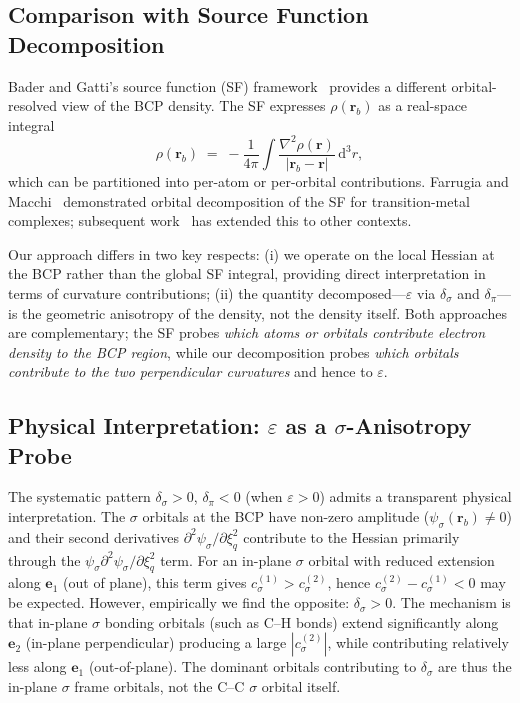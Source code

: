 \documentclass[twoside,natbib]{svjour3}
\newcommand{\delsg}{\delta_{\sigma}}
\newcommand{\delpi}{\delta_{\pi}}
\newcommand{\eps}{\varepsilon}
\begin{document}
\subsection{Comparison with Source Function Decomposition}

Bader and Gatti's source function (SF) framework~\citep{BaderGatti1998}
provides a different orbital-resolved view of the BCP density. The SF
expresses $\rho(\mathbf{r}_b)$ as a real-space integral
\begin{equation}
\rho(\mathbf{r}_b)
\;=\;
-\frac{1}{4\pi} \int \frac{\nabla^2 \rho(\mathbf{r})}
                          {|\mathbf{r}_b - \mathbf{r}|}\,
\mathrm{d}^3 r,
\label{eq:sf}
\end{equation}
which can be partitioned into per-atom or per-orbital contributions.
Farrugia and Macchi~\citep{Farrugia2009} demonstrated orbital
decomposition of the SF for transition-metal complexes; subsequent
work~\citep{Monza2011,Baggioli2018} has extended this to other
contexts.

Our approach differs in two key respects: (i) we operate on the local
Hessian at the BCP rather than the global SF integral, providing
direct interpretation in terms of curvature contributions; (ii) the
quantity decomposed---$\eps$ via $\delsg$ and $\delpi$---is the
geometric anisotropy of the density, not the density itself. Both
approaches are complementary; the SF probes \emph{which atoms or
orbitals contribute electron density to the BCP region}, while
our decomposition probes \emph{which orbitals contribute to the
two perpendicular curvatures} and hence to $\eps$.

\subsection{Physical Interpretation: $\eps$ as a $\sigma$-Anisotropy Probe}

The systematic pattern $\delsg > 0$, $\delpi < 0$ (when $\eps > 0$)
admits a transparent physical interpretation. The
$\sigma$ orbitals at the BCP have non-zero amplitude
($\psi_\sigma(\mathbf{r}_b) \ne 0$) and their second derivatives
$\partial^2 \psi_\sigma / \partial \xi_q^2$ contribute to the
Hessian primarily through the
$\psi_\sigma \partial^2 \psi_\sigma / \partial \xi_q^2$ term.
For an in-plane $\sigma$ orbital with reduced extension along
$\mathbf{e}_1$ (out of plane), this term gives
$c_\sigma^{(1)} > c_\sigma^{(2)}$, hence
$c_\sigma^{(2)} - c_\sigma^{(1)} < 0$ may be expected. However,
empirically we find the opposite: $\delsg > 0$. The mechanism is
that in-plane $\sigma$ bonding orbitals (such as C--H bonds) extend
significantly along $\mathbf{e}_2$ (in-plane perpendicular)
producing a large $|c_\sigma^{(2)}|$, while contributing relatively
less along $\mathbf{e}_1$ (out-of-plane). The dominant orbitals
contributing to $\delsg$ are thus the in-plane $\sigma$ frame
orbitals, not the C--C $\sigma$ orbital itself.
\end{document}
